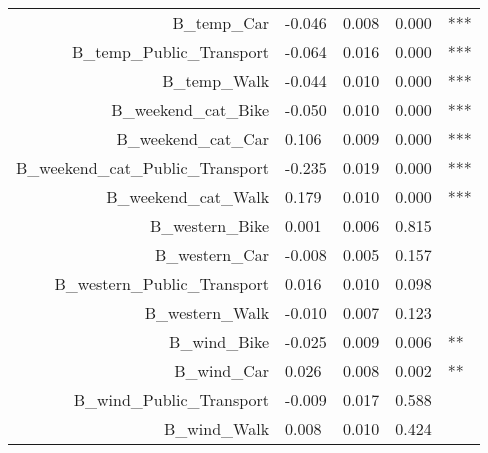 \begin{table}
\begin{tabular}{rllll}
B\_temp\_Car                         & -0.046 &    0.008 &    0.000 &          *** \\
B\_temp\_Public\_Transport           & -0.064 &    0.016 &    0.000 &          *** \\
B\_temp\_Walk                        & -0.044 &    0.010 &    0.000 &          *** \\
B\_weekend\_cat\_Bike                & -0.050 &    0.010 &    0.000 &          *** \\
B\_weekend\_cat\_Car                 &  0.106 &    0.009 &    0.000 &          *** \\
B\_weekend\_cat\_Public\_Transport   & -0.235 &    0.019 &    0.000 &          *** \\
B\_weekend\_cat\_Walk                &  0.179 &    0.010 &    0.000 &          *** \\
B\_western\_Bike                     &  0.001 &    0.006 &    0.815 &              \\
B\_western\_Car                      & -0.008 &    0.005 &    0.157 &              \\
B\_western\_Public\_Transport        &  0.016 &    0.010 &    0.098 &              \\
B\_western\_Walk                     & -0.010 &    0.007 &    0.123 &              \\
B\_wind\_Bike                        & -0.025 &    0.009 &    0.006 &           ** \\
B\_wind\_Car                         &  0.026 &    0.008 &    0.002 &           ** \\
B\_wind\_Public\_Transport           & -0.009 &    0.017 &    0.588 &              \\
B\_wind\_Walk                        &  0.008 &    0.010 &    0.424 &              \\
\bottomrule
\end{tabular}
\end{table}
